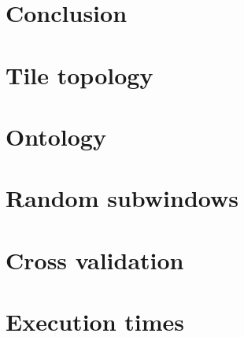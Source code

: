 \documentclass[a4paper,12pt]{report}
\begin{document}
	\chapter{Conclusion}
	
	
	\appendix
	
	\chapter{Tile topology}
	
	\newpage
	
	\chapter{Ontology}
	
	\newpage
	
	\chapter{Random subwindows}
	
	\newpage
	
	\chapter{Cross validation}
	
	\newpage
	
	\chapter{Execution times}
	
	\newpage
	


	\listoftables
	
	\listoffigures
	
	\printbibliography[heading=bibintoc]
\end{document}
